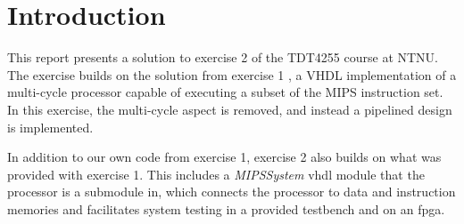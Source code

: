 \chapter{Introduction}
This report presents a solution to exercise 2 of the TDT4255 course at NTNU.
The exercise builds on the solution from exercise 1 \cite{bib:ex1-report},
a VHDL implementation of a multi-cycle processor capable of executing a subset of the MIPS instruction set.
In this exercise, the multi-cycle aspect is removed,
and instead a pipelined design is implemented.

In addition to our own code from exercise 1,
exercise 2 also builds on what was provided with exercise 1.
This includes a \textit{MIPSSystem} \gls{vhdl} module that the processor is a submodule in,
which connects the processor to data and instruction memories and facilitates system testing in a provided testbench and on an \gls{fpga}.





